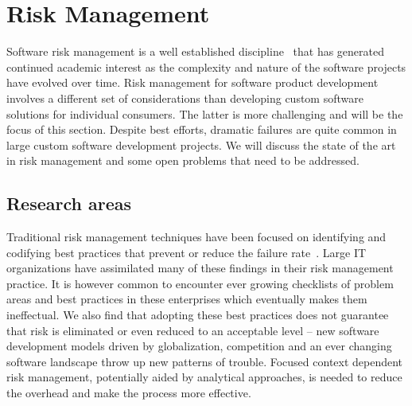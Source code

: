 \section{Risk Management}

Software risk management is a well established discipline~\cite{risk1,risk2} that has generated continued academic interest as the complexity and nature of the software projects have evolved over time. Risk management for software product development involves a different set of considerations than developing custom software solutions for individual consumers. The latter is more challenging and will be the focus of this section. Despite best efforts, dramatic failures are quite common in large custom software development projects. We will discuss the state of the art in risk management and some open problems that need to be addressed.

\subsection{Research areas}

Traditional risk management techniques have been focused on identifying and codifying best practices that prevent or reduce the failure rate~\cite{risk3,risk4,risk5}. Large IT organizations have assimilated many of these findings in their risk management practice.  It is however common to encounter ever growing checklists of problem areas and best practices in these enterprises which eventually makes them ineffectual. We also find that adopting these best practices does not guarantee that risk is eliminated or even reduced to an acceptable level -- new software development models driven by globalization, competition and an ever changing software landscape throw up new patterns of trouble. Focused context dependent risk management, potentially aided by analytical approaches, is needed to reduce the overhead and make the process more effective.

